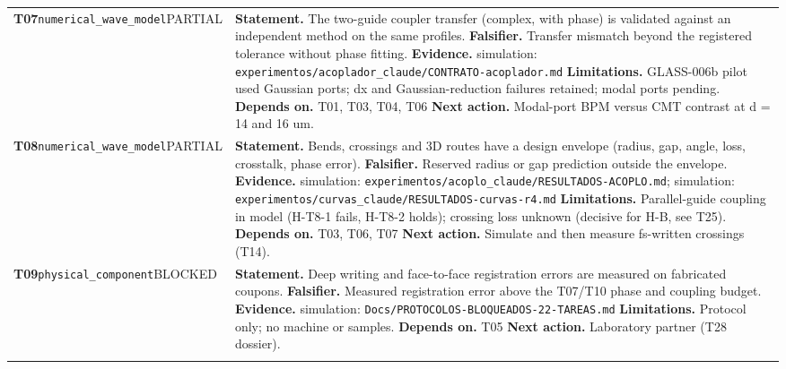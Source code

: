 \begin{longtable}{@{}>{\raggedright\arraybackslash}p{2.35cm}>{\raggedright\arraybackslash}p{13.2cm}@{}}
\textbf{T07}\newline \texttt{numerical\_\allowbreak{}wave\_\allowbreak{}model}\newline PARTIAL & \textbf{Statement.} The two-guide coupler transfer (complex, with phase) is validated against an independent method on the same profiles. \newline \textbf{Falsifier.} Transfer mismatch beyond the registered tolerance without phase fitting. \newline \textbf{Evidence.} simulation: \texttt{experimentos/\allowbreak{}acoplador\_\allowbreak{}claude/\allowbreak{}CONTRATO-acoplador.md} \newline \textbf{Limitations.} GLASS-006b pilot used Gaussian ports; dx and Gaussian-reduction failures retained; modal ports pending. \newline \textbf{Depends on.} T01, T03, T04, T06 \newline \textbf{Next action.} Modal-port BPM versus CMT contrast at d = 14 and 16 um. \\ \addlinespace[2pt]
\textbf{T08}\newline \texttt{numerical\_\allowbreak{}wave\_\allowbreak{}model}\newline PARTIAL & \textbf{Statement.} Bends, crossings and 3D routes have a design envelope (radius, gap, angle, loss, crosstalk, phase error). \newline \textbf{Falsifier.} Reserved radius or gap prediction outside the envelope. \newline \textbf{Evidence.} simulation: \texttt{experimentos/\allowbreak{}acoplo\_\allowbreak{}claude/\allowbreak{}RESULTADOS-ACOPLO.md}; simulation: \texttt{experimentos/\allowbreak{}curvas\_\allowbreak{}claude/\allowbreak{}RESULTADOS-curvas-r4.md} \newline \textbf{Limitations.} Parallel-guide coupling in model (H-T8-1 fails, H-T8-2 holds); crossing loss unknown (decisive for H-B, see T25). \newline \textbf{Depends on.} T03, T06, T07 \newline \textbf{Next action.} Simulate and then measure fs-written crossings (T14). \\ \addlinespace[2pt]
\textbf{T09}\newline \texttt{physical\_\allowbreak{}component}\newline BLOCKED & \textbf{Statement.} Deep writing and face-to-face registration errors are measured on fabricated coupons. \newline \textbf{Falsifier.} Measured registration error above the T07/\allowbreak{}T10 phase and coupling budget. \newline \textbf{Evidence.} simulation: \texttt{Docs/\allowbreak{}PROTOCOLOS-BLOQUEADOS-22-TAREAS.md} \newline \textbf{Limitations.} Protocol only; no machine or samples. \newline \textbf{Depends on.} T05 \newline \textbf{Next action.} Laboratory partner (T28 dossier). \\ \addlinespace[2pt]

\end{longtable}
